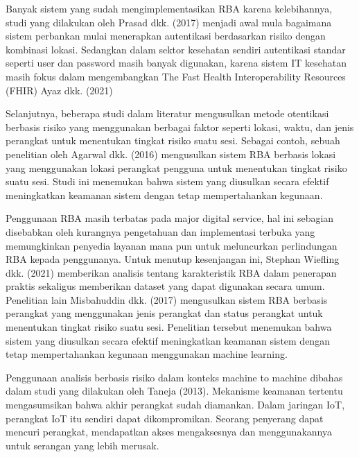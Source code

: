 Banyak sistem yang sudah mengimplementasikan RBA karena kelebihannya,
studi yang dilakukan oleh Prasad dkk. (2017) menjadi awal mula bagaimana sistem
perbankan mulai menerapkan autentikasi berdasarkan risiko dengan kombinasi
lokasi. Sedangkan dalam sektor kesehatan sendiri autentikasi standar seperti user
dan password masih banyak digunakan, karena sistem IT kesehatan masih fokus
dalam mengembangkan The Fast Health Interoperability Resources (FHIR) Ayaz
dkk. (2021)

Selanjutnya, beberapa studi dalam literatur mengusulkan metode otentikasi
berbasis risiko yang menggunakan berbagai faktor seperti lokasi, waktu, dan jenis
perangkat untuk menentukan tingkat risiko suatu sesi. Sebagai contoh, sebuah
penelitian oleh Agarwal dkk. (2016) mengusulkan sistem RBA berbasis lokasi yang
menggunakan lokasi perangkat pengguna untuk menentukan tingkat risiko suatu
sesi. Studi ini menemukan bahwa sistem yang diusulkan secara efektif
meningkatkan keamanan sistem dengan tetap mempertahankan kegunaan.

Penggunaan RBA masih terbatas pada major digital service, hal ini sebagian
disebabkan oleh kurangnya pengetahuan dan implementasi terbuka yang
memungkinkan penyedia layanan mana pun untuk meluncurkan perlindungan RBA
kepada penggunanya. Untuk menutup kesenjangan ini, Stephan Wiefling dkk.
(2021) memberikan analisis tentang karakteristik RBA dalam penerapan praktis
sekaligus memberikan dataset yang dapat digunakan secara umum.
Penelitian lain Misbahuddin dkk. (2017) mengusulkan sistem RBA berbasis
perangkat yang menggunakan jenis perangkat dan status perangkat untuk
menentukan tingkat risiko suatu sesi. Penelitian tersebut menemukan bahwa sistem
yang diusulkan secara efektif meningkatkan keamanan sistem dengan tetap
mempertahankan kegunaan menggunakan machine learning.

Penggunaan analisis berbasis risiko dalam konteks machine to machine dibahas
dalam studi yang dilakukan oleh Taneja (2013). Mekanisme keamanan tertentu
mengasumsikan bahwa akhir perangkat sudah diamankan. Dalam jaringan IoT,
perangkat IoT itu sendiri dapat dikompromikan. Seorang penyerang dapat mencuri
perangkat, mendapatkan akses mengaksesnya dan menggunakannya untuk
serangan yang lebih merusak.

